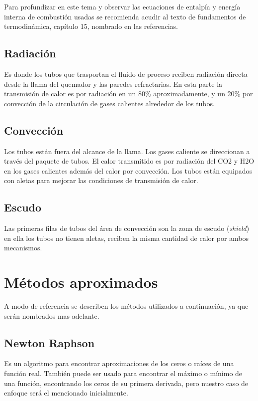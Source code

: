 \par Para profundizar en este tema y observar las ecuaciones de entalpía y energía interna de combustión usadas se recomienda acudir al texto de fundamentos de termodinámica\cite{bib:vanwylen}, capítulo 15, nombrado en las referencias.

\subsection{Radiación}
\par Es donde los tubos que trasportan el fluido de proceso reciben radiación directa desde la llama del quemador y las paredes refractarias. En esta parte la transmisión de calor es por radiación en un 80\% aproximadamente, y un 20\% por convección de la circulación de gases calientes alrededor de los tubos.

\subsection{Convección}
\par Los tubos están fuera del alcance de la llama. Los gases caliente se direccionan a través del paquete de tubos. El calor transmitido es por radiación del CO2 y H2O en los gases calientes además del calor por convección. Los tubos están equipados con aletas para mejorar las condiciones de transmisión de calor.

\subsection{Escudo}
\par Las primeras filas de tubos del área de convección son la zona de escudo (\textit{shield}) en ella los tubos no tienen aletas, reciben la misma cantidad de calor por ambos mecanismos.

\section{Métodos aproximados}
\par A modo de referencia se describen los métodos utilizados a continuación, ya que serán nombrados mas adelante.

\subsection{Newton Raphson}
\par Es un algoritmo para encontrar aproximaciones de los ceros o raíces de una función real. También puede ser usado para encontrar el máximo o mínimo de una función, encontrando los ceros de su primera derivada, pero nuestro caso de enfoque será el mencionado inicialmente.

